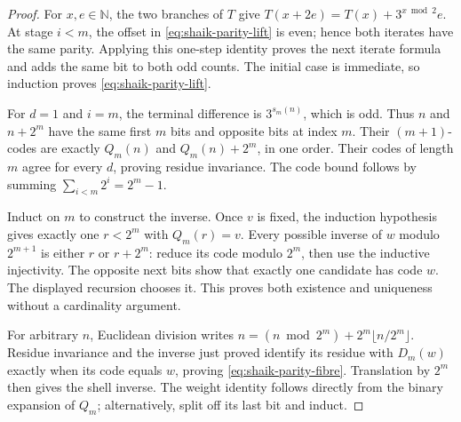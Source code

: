 \documentclass[11pt]{article}
\theoremstyle{remark}\newtheorem{remark}[proposition]{Remark}
\newcommand{\NN}{\mathbb N}
\begin{document}
\begin{proof}
For \(x,e\in\NN\), the two branches of \(T\) give
\(T(x+2e)=T(x)+3^{x\bmod2}e\).
At stage \(i<m\), the offset in
\eqref{eq:shaik-parity-lift} is even; hence both iterates have the
same parity. Applying this one-step identity proves the next iterate
formula and adds the same bit to both odd counts. The initial case is
immediate, so induction proves \eqref{eq:shaik-parity-lift}.

For \(d=1\) and \(i=m\), the terminal difference is \(3^{s_m(n)}\),
which is odd. Thus \(n\) and \(n+2^m\) have the same first \(m\)
bits and opposite bits at index \(m\). Their \((m+1)\)-codes are
exactly \(Q_m(n)\) and \(Q_m(n)+2^m\), in one order.
Their codes of length \(m\) agree for every \(d\), proving residue
invariance. The code bound follows by summing
\(\sum_{i<m}2^i=2^m-1\).

Induct on \(m\) to construct the inverse. Once \(v\) is fixed, the
induction hypothesis gives exactly one \(r<2^m\) with \(Q_m(r)=v\).
Every possible inverse of \(w\) modulo \(2^{m+1}\) is either \(r\)
or \(r+2^m\): reduce its code modulo \(2^m\), then use the
inductive injectivity. The opposite next bits show that exactly one
candidate has code \(w\). The displayed recursion chooses it.
This proves both existence and uniqueness without a cardinality argument.

For arbitrary \(n\), Euclidean division writes
\(n=(n\bmod2^m)+2^m\lfloor n/2^m\rfloor\).
Residue invariance and the inverse just proved identify its residue
with \(D_m(w)\) exactly when its code equals \(w\), proving
\eqref{eq:shaik-parity-fibre}. Translation by \(2^m\) then gives the
shell inverse. The weight identity follows directly from the binary
expansion of \(Q_m\); alternatively, split off its last bit and induct.
\end{proof}
\end{document}
